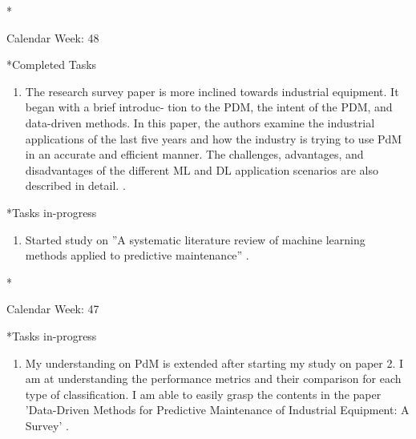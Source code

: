 \documentclass[11pt,a4paper]{article}
\begin{document}
\newpage
\begin{section}*{Calendar Week: 48 \hfill \date{27 November, 2020}}
 \begin{refsection}
     \begin{subsection}*{Completed Tasks}
         \begin{enumerate}
             \item
                   The research survey paper \cite{DBLP:journals/sj/ZhangYW19} is more inclined towards industrial equipment. It began with a brief introduc- tion to the PDM, the intent of the PDM, and data-driven methods. In this paper, the authors examine the industrial applications of the last five years and how the industry is trying to use PdM in an accurate and efficient manner. The challenges, advantages, and disadvantages of the different ML and DL application scenarios are also described in detail. \cite{survey1}.
         \end{enumerate}
     \end{subsection}

     \begin{subsection}*{Tasks in-progress}
         \begin{enumerate}
             \item
                   Started study on ”A systematic literature review of machine learning methods applied to predictive maintenance” \cite{DBLP:journals/candie/CarvalhoSVFBA19}.
         \end{enumerate}
     \end{subsection}
     \printbibliography
 \end{refsection}
\end{section}

\newpage
\begin{section}*{Calendar Week: 47 \hfill \date{20 November, 2020}}
 \begin{refsection}
     \begin{subsection}*{Tasks in-progress}
         \begin{enumerate}
             \item
                   My understanding on PdM is extended after starting my study on paper 2. I am at understanding the performance metrics and their comparison for each type of classification. I am able to easily grasp the contents in the paper ’Data-Driven Methods for Predictive Maintenance of Industrial Equipment: A Survey’ \cite{DBLP:journals/sj/ZhangYW19}.
         \end{enumerate}
     \end{subsection}
     \printbibliography
 \end{refsection}
\end{section}
\end{document}

